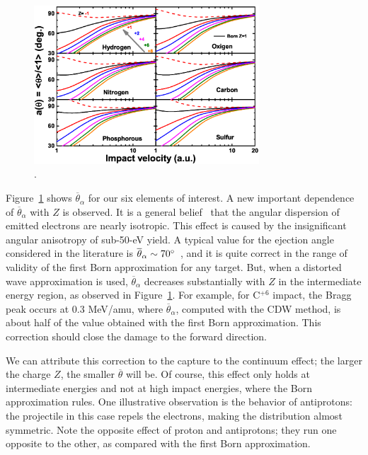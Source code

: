 \documentclass[preprint,12pt]{article}
\begin{document}
\begin{figure}[t!]
\centering
\includegraphics[width=0.75\textwidth]{figuras/Fig_finales/Fig6.eps}
\caption{.}
\label{fig:emittedang}
\end{figure} 

Figure~\ref{fig:emittedang} shows $\overline{\theta}_{\alpha}$ for our six elements of 
interest. A new important dependence of $\overline{\theta}_{\alpha}$ 
with $Z$ is observed. It is a general belief~\cite{Rudd1992} that the 
angular dispersion of emitted electrons are nearly isotropic. This effect 
is caused by the insignificant angular anisotropy of sub-50-eV yield. 
A typical value for the ejection angle considered in the literature is 
$\overline{\theta}_{\alpha}\sim 70\degree$~\cite{surdutovic2018}, and 
it is quite correct in the range of validity of the first Born 
approximation for any target. But, when a distorted wave approximation 
is used, $\overline{\theta}_{\alpha}$ decreases substantially with $Z$ 
in the intermediate energy region, as observed in Figure~\ref{fig:emittedang}. 
For example, for C$^{+6}$ impact, the Bragg peak occurs at 0.3 MeV/amu, 
where $\overline{\theta}_{\alpha}$, computed with the CDW method, is 
about half of the value obtained with the first Born approximation. 
This correction should close the damage to the forward direction.

We can attribute this correction to the capture to the continuum effect;
the larger the charge $Z$, the smaller $\overline{\theta}$ will be. Of 
course, this effect only holds at intermediate energies and not at high 
impact energies, where the Born approximation rules. One illustrative 
observation is the behavior of antiprotons: the projectile in this case 
repels the electrons, making the distribution almost symmetric. 
Note the opposite effect of proton and antiprotons; they run one 
opposite to the other, as compared with the first Born approximation.
\end{document}
